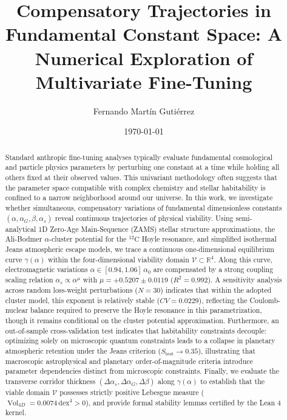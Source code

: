 \documentclass[aps,prd,twocolumn,superscriptaddress,nofootinbib,floatfix]{revtex4-2}
\begin{document}
\title{Compensatory Trajectories in Fundamental Constant Space: A Numerical Exploration of Multivariate Fine-Tuning}

\author{Fernando Martín Gutiérrez}

\date{\today}

\begin{abstract}
Standard anthropic fine-tuning analyses typically evaluate fundamental cosmological and particle physics parameters by perturbing one constant at a time while holding all others fixed at their observed values. This univariant methodology often suggests that the parameter space compatible with complex chemistry and stellar habitability is confined to a narrow neighborhood around our universe. In this work, we investigate whether simultaneous, compensatory variations of fundamental dimensionless constants $(\alpha, \alpha_G, \beta, \alpha_s)$ reveal continuous trajectories of physical viability. Using semi-analytical 1D Zero-Age Main-Sequence (ZAMS) stellar structure approximations, the Ali-Bodmer $\alpha$-cluster potential for the $^{12}\mathrm{C}$ Hoyle resonance, and simplified isothermal Jeans atmospheric escape models, we trace a continuous one-dimensional equilibrium curve $\gamma(\alpha)$ within the four-dimensional viability domain $\mathcal{V} \subset \mathbb{R}^4$. Along this curve, electromagnetic variations $\alpha \in [0.94, 1.06]\,\alpha_0$ are compensated by a strong coupling scaling relation $\alpha_s \propto \alpha^{\mu}$ with $\mu = +0.5207 \pm 0.0119$ ($R^2 = 0.992$). A sensitivity analysis across random loss-weight perturbations ($N=30$) indicates that within the adopted cluster model, this exponent is relatively stable ($CV = 0.0229$), reflecting the Coulomb-nuclear balance required to preserve the Hoyle resonance in this parametrization, though it remains conditional on the cluster potential approximation. Furthermore, an out-of-sample cross-validation test indicates that habitability constraints decouple: optimizing solely on microscopic quantum constraints leads to a collapse in planetary atmospheric retention under the Jeans criterion ($S_{\text{test}} \to 0.35$), illustrating that macroscopic astrophysical and planetary order-of-magnitude criteria introduce parameter dependencies distinct from microscopic constraints. Finally, we evaluate the transverse corridor thickness $(\Delta \alpha_s, \Delta \alpha_G, \Delta \beta)$ along $\gamma(\alpha)$ to establish that the viable domain $\mathcal{V}$ possesses strictly positive Lebesgue measure ($\operatorname{Vol}_{4D} = 0.0074\,\text{dex}^4 > 0$), and provide formal stability lemmas certified by the Lean 4 kernel.
\end{abstract}
\end{document}

